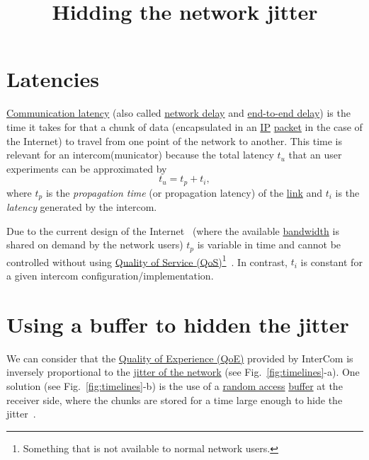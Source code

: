
\title{Hidding the network jitter}

\maketitle
\tableofcontents

\section{Latencies}
\href{https://en.wikipedia.org/wiki/Latency_(engineering)#Communication_latency}{Communication
  latency} (also called
\href{https://en.wikipedia.org/wiki/Network_delay}{network delay} and
\href{https://en.wikipedia.org/wiki/End-to-end_delay}{end-to-end
  delay}) is the time it takes for that a chunk of data (encapsulated
in an \href{https://en.wikipedia.org/wiki/Internet_Protocol}{IP}
\href{https://en.wikipedia.org/wiki/Network_packet}{packet} in the
case of the Internet) to travel from one point of the network to
another. This time is relevant for an intercom(municator) because the
total latency $t_u$ that an user experiments can be approximated by
\begin{equation}
  t_u = t_p + t_i,
  \label{eq:user_latency}
\end{equation}
where $t_p$ is the \emph{propagation time} (or propagation latency) of
the \href{https://en.wikipedia.org/wiki/Telecommunications_link}{link}
and $t_i$ is the \emph{latency} generated by the intercom.

Due to the current design of the Internet~\cite{Tanenbaum,Stallings}
(where the available
\href{https://en.wikipedia.org/wiki/Bandwidth_(computing)}{bandwidth}
is shared on demand by the network users) $t_p$ is variable in time
and cannot be controlled without using
\href{https://en.wikipedia.org/wiki/Quality_of_service}{Quality of
  Service (QoS)}\footnote{Something that is not available to normal
network users.}~\cite{dordal2020intro}. In contrast, $t_i$ is constant
for a given intercom configuration/implementation.

\section{Using a buffer to hidden the jitter}

We can consider that the
\href{https://en.wikipedia.org/wiki/Quality_of_experience}{Quality of
  Experience (QoE)} provided by InterCom is inversely proportional to
the \href{https://en.wikipedia.org/wiki/Packet_delay_variation}{jitter
  of the network} (see Fig.~\ref{fig:timelines}-a). One solution (see
Fig.~\ref{fig:timelines}-b) is the use of a
\href{https://en.wikipedia.org/wiki/Random_access}{random access}
\href{https://en.wikipedia.org/wiki/Data_buffer}{buffer} at the
receiver side, where the chunks are stored for a time large enough to
hide the jitter~\cite{Kurose-Ross}.

